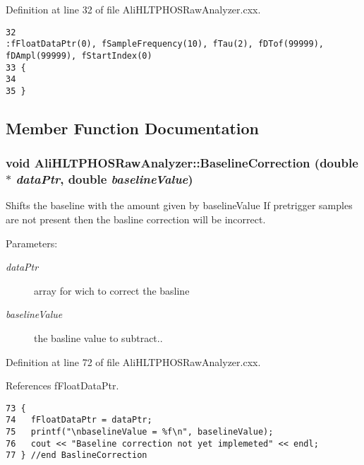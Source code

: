 Definition at line 32 of file Ali\-HLTPHOSRaw\-Analyzer.cxx.

\footnotesize\begin{verbatim}32                                                                         :fFloatDataPtr(0), fSampleFrequency(10), fTau(2), fDTof(99999), fDAmpl(99999), fStartIndex(0)
33 {
34 
35 }
\end{verbatim}\normalsize 




\subsection{Member Function Documentation}
\subsubsection{\setlength{\rightskip}{0pt plus 5cm}void Ali\-HLTPHOSRaw\-Analyzer::Baseline\-Correction (double $\ast$ {\em data\-Ptr}, double {\em baseline\-Value})}\label{classAliHLTPHOSRawAnalyzer_a6}


Shifts the baseline with the amount given by baseline\-Value If pretrigger samples are not present then the basline correction will be incorrect. \begin{Desc}
\item[Parameters:]
\begin{description}
\item[{\em data\-Ptr}]array for wich to correct the basline \item[{\em baseline\-Value}]the basline value to subtract.. \end{description}
\end{Desc}


Definition at line 72 of file Ali\-HLTPHOSRaw\-Analyzer.cxx.

References f\-Float\-Data\-Ptr.

\footnotesize\begin{verbatim}73 {
74   fFloatDataPtr = dataPtr;   
75   printf("\nbaselineValue = %f\n", baselineValue);
76   cout << "Baseline correction not yet implemeted" << endl;
77 } //end BaslineCorrection
\end{verbatim}\normalsize 


